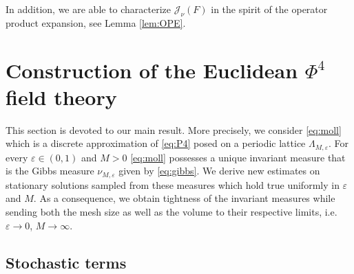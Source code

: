 \documentclass[a4paper,11pt]{article}
\numberwithin{equation}{section}
\begin{document}
In addition, we are able to characterize $\mathcal{J}_{\nu}(F)$ in the spirit of the operator product expansion, see Lemma \ref{lem:OPE}.




\section{Construction of the Euclidean $\Phi^4$ field theory}

\label{sec:tight}This section is devoted to our main result. More precisely,
we consider \eqref{eq:moll} which is a discrete approximation of {\eqref{eq:P4}} posed on a periodic
lattice $\Lambda_{M, \varepsilon}$. For every $\varepsilon \in (0, 1)$
and $M > 0$ \eqref{eq:moll} possesses a unique invariant measure that is the Gibbs measure $\nu_{M,\varepsilon}$ given by \eqref{eq:gibbs}.
We derive new estimates on stationary solutions sampled from these measures
which hold true uniformly in $\varepsilon$ and $M$. As a consequence, we
obtain tightness of the invariant measures while sending both the mesh size as
well as the volume to their respective limits, i.e. $\varepsilon \rightarrow
0$, $M \rightarrow \infty$.




\subsection{Stochastic terms}
\end{document}
